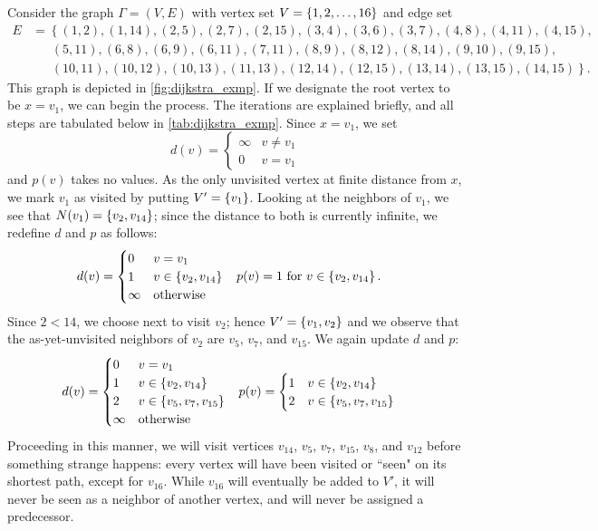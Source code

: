 \documentclass[m3380-lec-main.tex]{subfiles}
\begin{document}
\begin{exmp} Consider the graph $\Gamma=(V,E)$ with vertex set $V=\left\{1,2,\ldots,16\right\}$ and edge set 
\begin{align*} 
E &= \left\{(1, 2), (1, 14), (2, 5), (2, 7), (2, 15), (3, 4), (3, 6), (3, 7), (4, 8), (4, 11), (4, 15), \right. \\
 &\phantom{=}~\left.(5, 11), (6, 8), (6, 9), (6, 11), (7, 11), (8, 9), (8, 12), (8, 14), (9, 10), (9, 15),\right. \\
 &\phantom{=}~\left.(10, 11), (10, 12), (10, 13), (11, 13), (12, 14), (12, 15), (13, 14), (13, 15), (14, 15)\right\}.
\end{align*}
This graph is depicted in \autoref{fig:dijkstra_exmp}. If we designate the root vertex to be $x=v_1$, we can begin the process.
The iterations are explained briefly, and all steps are tabulated below in \autoref{tab:dijkstra_exmp}. Since $x=v_1$, we set 
\[d(v) = \begin{cases}\infty & v\neq v_1 \\0 & v=v_1
\end{cases}\]
and $p(v)$ takes no values. As the only unvisited vertex at finite distance from $x$, we mark $v_1$ as visited by putting $V'=\left\{v_1\right\}$. Looking at the neighbors of $v_1$, we see that $N(v_1) = \left\{v_2, v_{14}\right\}$; since the distance to both is currently infinite, we redefine $d$ and $p$ as follows:
\begin{align*}
d(v) &= \begin{cases} 
    0 & v=v_1 \\ 
    1 & v\in \left\{v_2,v_{14}\right\} \\ 
    \infty & \text{otherwise} 
\end{cases} &
p(v) &= 1\text{ for } v\in\left\{v_2, v_{14}\right\}.
\end{align*}
Since $2<14$, we choose next to visit $v_2$; hence $V'=\left\{v_1,v_2\right\}$ and we observe that the as-yet-unvisited neighbors of $v_2$ are $v_5$, $v_7$, and $v_{15}$. We again update $d$ and $p$:
\begin{align*}
d(v) &= \begin{cases} 
    0 & v=v_1 \\ 
    1 & v\in \left\{v_2,v_{14}\right\} \\ 
    2 & v\in \left\{v_5, v_7, v_{15}\right\} \\
    \infty & \text{otherwise} 
\end{cases} &
p(v) &= \begin{cases} 
    1 & v\in\left\{v_2, v_{14}\right\} \\ 
    2 & v\in\left\{v_5, v_7, v_{15}\right\}
\end{cases}
\end{align*}
Proceeding in this manner, we will visit vertices $v_{14}$, $v_5$, $v_7$, $v_{15}$, $v_8$, and $v_{12}$ before something strange happens: every vertex will have been visited or ``seen" on its shortest path, except for $v_{16}$. While $v_{16}$ will eventually be added to $V'$, it will never be seen as a neighbor of another vertex, and will never be assigned a predecessor.
\end{exmp}
\end{document}
